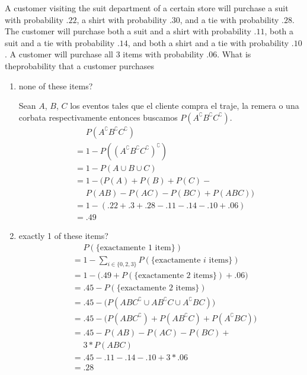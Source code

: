 \item A customer visiting the suit department of a certain store will purchase a suit with probability $.22$, a shirt with probability $.30$, and a tie with probability $.28$. The customer will purchase both a suit and a shirt with probability $.11$, both a suit and a tie with probability $.14$, and both a shirt and a tie with probability $.10$. A customer will purchase all 3 items with probability $.06$. What is theprobability that a customer purchases
\begin{enumerate}
    \item none of these items?

    Sean $A$, $B$, $C$ los eventos tales que el cliente compra el traje, la remera o una corbata respectivamente entonces buscamos $P(A^\complement  B^\complement  C^\complement )$.
    \begin{align*}
        &\phantom{{}={}} P(A^\complement  B^\complement  C^\complement )\\
        &= 1 - P((A^\complement  B^\complement  C^\complement )^\complement )\\
        &= 1 - P(A \cup B \cup C)\\
        &= 1 - \Big ( P(A) + P(B) + P(C) - {}\\
        &\phantom{{}={}} P(A B) -
        P(A C) -
        P(B C) + P(A B C) \Big )\\
        &= 1 - ( .22 + .3 + .28 - .11 - .14 - .10 + .06 )\\
        &= .49
    \end{align*}
    
    \item exactly 1 of these items?
    \begin{align*}
        &\phantom{{}={}} P(\{\text{exactamente 1 item}\})\\
        &= 1 - \sum_{i\in\{0,2,3\}} P(\{\text{exactamente $i$ items}\})\\
        &= 1 - \big( .49 + P(\{\text{exactamente 2 items}\}) + .06 \big)\\
        &= .45 - P(\{\text{exactamente 2 items}\})\\
        &= .45 - \big ( P(ABC^\complement  \cup AB^\complement C \cup A^\complement BC) \big )\\
        &= .45 - \big ( P(ABC^\complement ) + P(AB^\complement C) + P(A^\complement BC) \big )\\
        &= .45 - P(AB) - P(AC) - P(BC) + {}\\
        &\phantom{{}={}} 3 * P(ABC)\\
        &= .45 - .11 - .14 - .10 + 3 * .06\\
        &= .28
    \end{align*}
\end{enumerate}